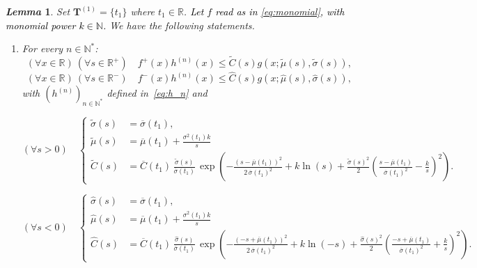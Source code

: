 \documentclass[review]{elsarticle}
\newcommand{\cblue}{\textcolor{black}}
\newtheorem{lemma}{\em Lemma}
\newcommand{\bR}{\mathbb{R}}
\newcommand{\solal}[1]{\textcolor{green}{\textbf{[{\em SOLAL SAYS}: #1]}}}
\begin{document}
\begin{lemma} \label{lemm:compact}
Set $\mathbf{T}^{(1)} = \{t_1\}$ where $t_1 \in \bR$. \cblue{Let $f$ read as in \eqref{eq:monomial}, with monomial power $k \in \mathbb{N}$.} %
We have the following statements. 
\begin{enumerate}
    \item[(i)] For every $n \in \mathbb{N}^*$:   
    \begin{equation}
    \label{eq_fplus}
         (\forall x \in \mathbb{R}) \ (\forall s \in \mathbb{R}^+) \quad f^+(x) h^{(n)}(x) \leq \widetilde{C}(s) g(x; \widetilde{\mu}(s), \widetilde{\sigma}(s)),
    \end{equation}
    \begin{equation}
    \label{eq_fmoins}
        (\forall x \in \mathbb{R}) \ (\forall s \in \mathbb{R}^-) \quad f^-(x) h^{(n)}(x) \leq \widehat{C}(s) g(x; \widehat{\mu}(s), \widehat{\sigma}(s)),
    \end{equation}  
with $(h^{(n)})_{n\in\mathbb{N}^*}$ defined in~\eqref{eq:h_n} and

   \begin{equation}
(\forall s > 0) \quad
\begin{cases}
\label{eq:widetildesigma}
\widetilde{\sigma}(s) & = \overline{\sigma}(t_1),\\
\widetilde{\mu}(s) & = \overline{\mu}(t_1)+\frac{\sigma^2(t_1)k}{s} \\
\widetilde{C}(s) & = \overline{C}(t_1)\, \frac{\widetilde{\sigma}(s)}{\overline{\sigma}(t_1)}\,
\exp\!\left(
- \frac{(s-\overline{\mu}(t_1))^2}{2\,\overline{\sigma}(t_1)^2}
+ k\ln(s)
+ \frac{\widetilde{\sigma}(s)^2}{2}\left(\frac{s-\overline{\mu}(t_1)}{\overline{\sigma}(t_1)^2} - \frac{k}{s}\right)^{\!2}
\right).
\end{cases}
\end{equation}

\begin{equation}
\label{eq:widehatsigma}
(\forall s < 0) \quad
\begin{cases}
\widehat{\sigma}(s) &= \overline{\sigma}(t_1), \\
\widehat{\mu}(s) &= \overline{\mu}(t_1)+\frac{\sigma^2(t_1)k}{s} \\
\widehat{C}(s) &= \overline{C}(t_1)\, \frac{\widehat{\sigma}(s)}{\overline{\sigma}(t_1)}\,
\exp\!\left(
- \frac{(-s+\overline{\mu}(t_1))^2}{2\,\overline{\sigma}(t_1)^2}
+ k \ln(-s)
+ \frac{\widehat{\sigma}(s)^2}{2}\left(\frac{-s+\overline{\mu}(t_1)}{\overline{\sigma}(t_1)^2} + \frac{k}{s}\right)^{\!2}
\right).
\end{cases}
\end{equation}


\end{enumerate}
\end{lemma}
\end{document}
